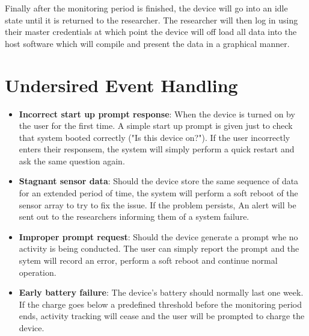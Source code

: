 \documentclass[12pt]{article}
\begin{document}
Finally after the monitoring period is finished, the device will go into an idle state until it is returned to the researcher. The researcher will then log in using their master credentials at which point the device will off load all data into the host software which will compile and present the data in a graphical manner.

\section{Undersired Event Handling}
\label{UEH}
\begin{itemize}
	\item \textbf{Incorrect start up prompt response}: When the device is turned on by the user for the first time. A simple start up prompt is given just to check that system booted correctly ("Is this device on?"). If the user incorrectly enters their responsem, the system will simply 				perform a quick restart and ask the same question again.

	\item \textbf{Stagnant sensor data}: Should the device store the same sequence of data for an extended period of time, the system will perform a soft reboot of the sensor array to try to fix the issue. If the problem persists, An alert will be sent out to the researchers informing them 			of a system failure.

	\item \textbf{Improper prompt request}: Should the device generate a prompt whe no activity is being conducted. The user can simply report the prompt and the sytem will record an error, perform a soft reboot and continue normal operation.

	\item \textbf{Early battery failure}: The device's battery should normally last one week. If the charge goes below a predefined threshold before the monitoring period ends, activity tracking will cease and the user will be prompted to charge the device.
\end{itemize}





\pagebreak
\end{document}
